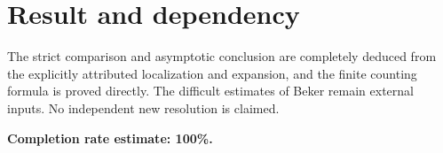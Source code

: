 \documentclass[11pt]{article}
\begin{document}
\section*{Result and dependency}
The strict comparison and asymptotic conclusion are completely deduced from the explicitly attributed localization and expansion, and the finite counting formula is proved directly. The difficult estimates of Beker remain external inputs. No independent new resolution is claimed.

\textbf{Completion rate estimate: 100\%.}
\end{document}
